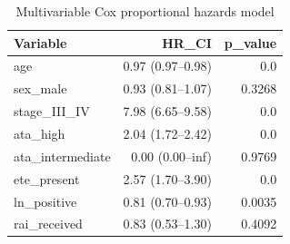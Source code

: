 \begin{table}[htbp]
\centering
\caption{Multivariable Cox proportional hazards model}
\label{tab:cox_ph}
\begin{tabular}{lrr}
\toprule
Variable & HR\_CI & p\_value \\
\midrule
age & 0.97 (0.97--0.98) & 0.0 \\
sex\_male & 0.93 (0.81--1.07) & 0.3268 \\
stage\_III\_IV & 7.98 (6.65--9.58) & 0.0 \\
ata\_high & 2.04 (1.72--2.42) & 0.0 \\
ata\_intermediate & 0.00 (0.00--inf) & 0.9769 \\
ete\_present & 2.57 (1.70--3.90) & 0.0 \\
ln\_positive & 0.81 (0.70--0.93) & 0.0035 \\
rai\_received & 0.83 (0.53--1.30) & 0.4092 \\
\bottomrule
\end{tabular}
\end{table}
